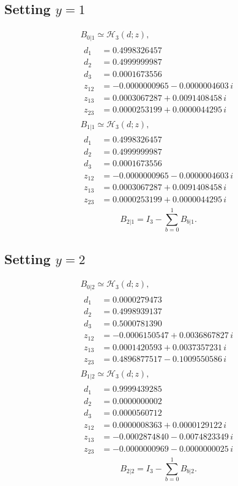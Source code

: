 \documentclass[11pt]{article}
\begin{document}
\subsection*{Setting $y=1$}
\[
\begin{gathered}
B_{0|1}\simeq\mathcal H_3(d;z),\\[3pt]
\begin{aligned}
d_1&=0.4998326457 \\
d_2&=0.4999999987 \\
d_3&=0.0001673556 \\
z_{12}&=-0.0000000965-0.0000004603\,i \\
z_{13}&=0.0003067287+0.0091408458\,i \\
z_{23}&=0.0000253199+0.0000044295\,i
\end{aligned}
\end{gathered}
\]
\[
\begin{gathered}
B_{1|1}\simeq\mathcal H_3(d;z),\\[3pt]
\begin{aligned}
d_1&=0.4998326457 \\
d_2&=0.4999999987 \\
d_3&=0.0001673556 \\
z_{12}&=-0.0000000965-0.0000004603\,i \\
z_{13}&=0.0003067287+0.0091408458\,i \\
z_{23}&=0.0000253199+0.0000044295\,i
\end{aligned}
\end{gathered}
\]
\[
B_{2|1}=I_3-\sum_{b=0}^1B_{b|1}.
\]
\subsection*{Setting $y=2$}
\[
\begin{gathered}
B_{0|2}\simeq\mathcal H_3(d;z),\\[3pt]
\begin{aligned}
d_1&=0.0000279473 \\
d_2&=0.4998939137 \\
d_3&=0.5000781390 \\
z_{12}&=-0.0006150547+0.0036867827\,i \\
z_{13}&=0.0001420593+0.0037357231\,i \\
z_{23}&=0.4896877517-0.1009550586\,i
\end{aligned}
\end{gathered}
\]
\[
\begin{gathered}
B_{1|2}\simeq\mathcal H_3(d;z),\\[3pt]
\begin{aligned}
d_1&=0.9999439285 \\
d_2&=0.0000000002 \\
d_3&=0.0000560712 \\
z_{12}&=0.0000008363+0.0000129122\,i \\
z_{13}&=-0.0002874840-0.0074823349\,i \\
z_{23}&=-0.0000000969-0.0000000025\,i
\end{aligned}
\end{gathered}
\]
\[
B_{2|2}=I_3-\sum_{b=0}^1B_{b|2}.
\]
\end{document}

